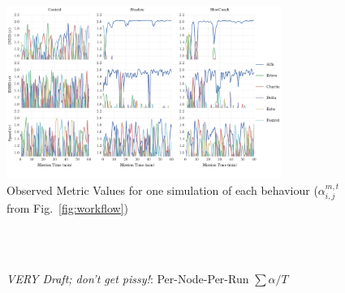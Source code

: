 \documentclass[conference]{IEEEtran}
\begin{document}
\begin{figure}
  \centering
  \includegraphics[width=0.8\textwidth]{Metric_Sigma_Deviance}
  \caption{Observed Metric Values for one simulation of each behaviour ($\alpha_{i,j}^{m,t}$ from Fig.~\ref{fig:workflow})}
\end{figure}

\begin{figure}
  \centering
  \\
  \\
  \caption{\emph{VERY Draft; don't get pissy!}: Per-Node-Per-Run $\sum\alpha/T$}
\end{figure}
\end{document}
